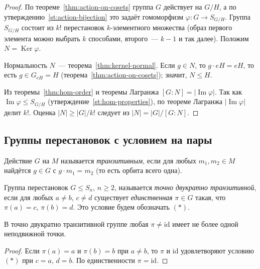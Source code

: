 \documentclass[12pt]{article}
\begin{document}
	\begin{proof}
		По теореме~\ref{thm:action-on-cosets} группа $G$ действует на $G/H$, а по утверждению~\ref{st:action-bijection} это задаёт гомоморфизм $\varphi: G \to S_{G/H}$. Группа $S_{G/H}$ состоит из $k!$ перестановок $k$-элементного множества (образ первого элемента можно выбрать $k$ способами, второго~--- $k - 1$ и так далее). Положим $N = \operatorname{Ker}\varphi$.

		Нормальность $N$~--- теорема~\ref{thm:kernel-normal}. Если $g \in N$, то $g \cdot eH = eH$, то есть $g \in G_{eH} = H$ (теорема~\ref{thm:action-on-cosets}); значит, $N \leqslant H$.

		Из теоремы~\ref{thm:hom-order} и теоремы Лагранжа $[G : N] = |\operatorname{Im}\varphi|$. Так как $\operatorname{Im}\varphi \leqslant S_{G/H}$ (утверждение~\ref{st:hom-properties}), по теореме Лагранжа $|\operatorname{Im}\varphi|$ делит $k!$. Оценка $|N| \geqslant |G|/k!$ следует из $|N| = |G| / [G : N]$.
	\end{proof}

	\subsection{Группы перестановок с условием на пары}

	\begin{definition}[Транзитивность]
		Действие $G$ на $M$ называется \emph{транзитивным}, если для любых $m_1, m_2 \in M$ найдётся $g \in G$ с $g \cdot m_1 = m_2$ (то есть орбита всего одна).
	\end{definition}

	\begin{definition}\label{def:sharply-2-transitive}
		Группа перестановок $G \leqslant S_n$, $n \geqslant 2$, называется \emph{точно двукратно транзитивной}, если для любых $a \ne b$, $c \ne d$ существует \emph{единственная} $\pi \in G$ такая, что $\pi(a) = c$, $\pi(b) = d$. Это условие будем обозначать $(\ast)$.
	\end{definition}

	\begin{lemma}\label{lem:one-fixed-point}
		В точно двукратно транзитивной группе любая $\pi \ne \mathrm{id}$ имеет не более одной неподвижной точки.
	\end{lemma}

	\begin{proof}
		Если $\pi(a) = a$ и $\pi(b) = b$ при $a \ne b$, то $\pi$ и $\mathrm{id}$ удовлетворяют условию $(\ast)$ при $c = a$, $d = b$. По единственности $\pi = \mathrm{id}$.
	\end{proof}
\end{document}
